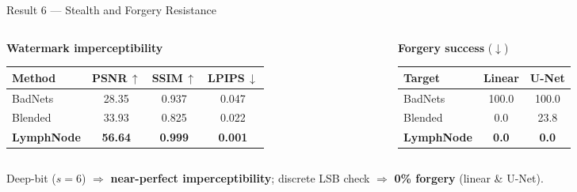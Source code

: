 \documentclass{beamer}
\begin{document}
\begin{frame}{Result 6 --- Stealth and Forgery Resistance}
    \footnotesize
    \begin{columns}[T,totalwidth=\textwidth]
        \begin{column}{0.56\textwidth}
            \centering\textbf{Watermark imperceptibility}\\[4pt]
            {\scriptsize
            \setlength{\tabcolsep}{4pt}\renewcommand{\arraystretch}{1.3}
            \begin{tabular}{lccc}
                \toprule
                Method & PSNR\,$\uparrow$ & SSIM\,$\uparrow$ & LPIPS\,$\downarrow$ \\
                \midrule
                BadNets & 28.35 & 0.937 & 0.047 \\
                Blended & 33.93 & 0.825 & 0.022 \\
                \textbf{LymphNode} & \textbf{56.64} & \textbf{0.999} & \textbf{0.001} \\
                \bottomrule
            \end{tabular}}
        \end{column}
        \begin{column}{0.42\textwidth}
            \centering\textbf{Forgery success} ($\downarrow$)\\[4pt]
            {\scriptsize
            \setlength{\tabcolsep}{6pt}\renewcommand{\arraystretch}{1.3}
            \begin{tabular}{lcc}
                \toprule
                Target & Linear & U-Net \\
                \midrule
                BadNets & 100.0 & 100.0 \\
                Blended & 0.0 & 23.8 \\
                \textbf{LymphNode} & \textbf{0.0} & \textbf{0.0} \\
                \bottomrule
            \end{tabular}}
        \end{column}
    \end{columns}
    \vspace{0.4cm}
    \centering\footnotesize Deep-bit ($s{=}6$) $\Rightarrow$ \textbf{near-perfect imperceptibility}; discrete LSB check $\Rightarrow$ \textbf{0\% forgery} (linear \& U-Net).
\end{frame}
\end{document}
